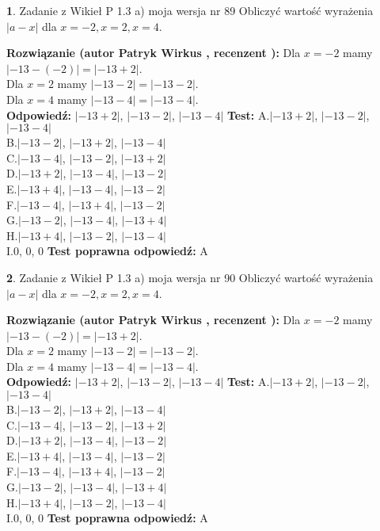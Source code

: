 \documentclass[12pt, a4paper]{article}
\theoremstyle{definition} %
\newtheorem{zad}{}
\newcommand{\zadStart}[1]{\begin{zad}#1\newline}
\newcommand{\zadStop}{\end{zad}}
\newcommand{\rozwStart}[2]{\noindent \textbf{Rozwiązanie (autor #1 , recenzent #2): }\newline}
\newcommand{\rozwStop}{\newline}
\newcommand{\odpStart}{\noindent \textbf{Odpowiedź:}\newline}
\newcommand{\odpStop}{\newline}
\newcommand{\testStart}{\noindent \textbf{Test:}\newline}
\newcommand{\testStop}{\newline}
\newcommand{\kluczStart}{\noindent \textbf{Test poprawna odpowiedź:}\newline}
\newcommand{\kluczStop}{\newline}
\begin{document}
\zadStart{Zadanie z Wikieł P 1.3 a) moja wersja nr 89}
Obliczyć wartość wyrażenia $|a - x|$ dla $x=-2,x=2,x=4$.
\zadStop
\rozwStart{Patryk Wirkus}{}
Dla $x = -2$ mamy $|-13 - (-2)| = |-13 + 2|$.\\
Dla $x = 2$ mamy $|-13 - 2| = |-13 - 2|$.\\
Dla $x = 4$ mamy $|-13 - 4| = |-13 - 4|$.\\
\rozwStop
\odpStart
$|-13 + 2|$, $|-13 - 2|$, $|-13 - 4|$
\odpStop
\testStart
A.$|-13 + 2|$, $|-13 - 2|$, $|-13 - 4|$\\
B.$|-13 - 2|$, $|-13 + 2|$, $|-13 - 4|$\\
C.$|-13 - 4|$, $|-13 - 2|$, $|-13 + 2|$\\
D.$|-13 + 2|$, $|-13 - 4|$, $|-13 - 2|$\\
E.$|-13 + 4|$, $|-13 - 4|$, $|-13 - 2|$\\
F.$|-13 - 4|$, $|-13 + 4|$, $|-13 - 2|$\\
G.$|-13 - 2|$, $|-13 - 4|$, $|-13 + 4|$\\
H.$|-13 + 4|$, $|-13 - 2|$, $|-13 - 4|$\\
I.$0$, $0$, $0$
\testStop
\kluczStart
A
\kluczStop



\zadStart{Zadanie z Wikieł P 1.3 a) moja wersja nr 90}
Obliczyć wartość wyrażenia $|a - x|$ dla $x=-2,x=2,x=4$.
\zadStop
\rozwStart{Patryk Wirkus}{}
Dla $x = -2$ mamy $|-13 - (-2)| = |-13 + 2|$.\\
Dla $x = 2$ mamy $|-13 - 2| = |-13 - 2|$.\\
Dla $x = 4$ mamy $|-13 - 4| = |-13 - 4|$.\\
\rozwStop
\odpStart
$|-13 + 2|$, $|-13 - 2|$, $|-13 - 4|$
\odpStop
\testStart
A.$|-13 + 2|$, $|-13 - 2|$, $|-13 - 4|$\\
B.$|-13 - 2|$, $|-13 + 2|$, $|-13 - 4|$\\
C.$|-13 - 4|$, $|-13 - 2|$, $|-13 + 2|$\\
D.$|-13 + 2|$, $|-13 - 4|$, $|-13 - 2|$\\
E.$|-13 + 4|$, $|-13 - 4|$, $|-13 - 2|$\\
F.$|-13 - 4|$, $|-13 + 4|$, $|-13 - 2|$\\
G.$|-13 - 2|$, $|-13 - 4|$, $|-13 + 4|$\\
H.$|-13 + 4|$, $|-13 - 2|$, $|-13 - 4|$\\
I.$0$, $0$, $0$
\testStop
\kluczStart
A
\kluczStop
\end{document}
